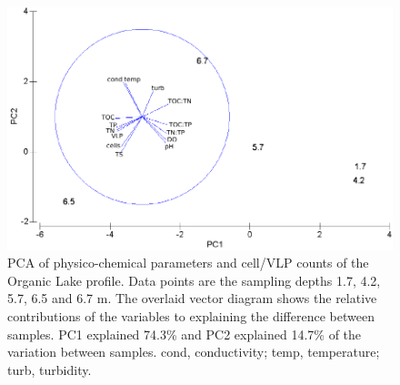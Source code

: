 \begin{figure}
\centering
\includegraphics[width=120mm]{orglake_figures/pca.pdf}
\caption[\acs{PCA} of physico-chemical parameters]{\acs{PCA} of physico-chemical parameters and cell/\ac{VLP} counts of the Organic Lake profile. Data points are the sampling depths 1.7, 4.2, 5.7, 6.5 and 6.7 m. The overlaid vector diagram shows the relative contributions of the variables to explaining the difference between samples. PC1 explained 74.3\% and PC2 explained 14.7\% of the variation between samples. cond, conductivity; temp, temperature; turb, turbidity.}
\label{fig:pca}

\end{figure}
